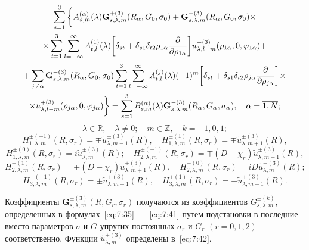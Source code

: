 \begin{multline}
\sum\limits_{s = 1}^3 \bigg\{  A_{s,m}^{(\alpha )}(\lambda ){\bf{G}}_{s,\lambda ,m}^{ + (3)}({R_\alpha },{G_0},{\sigma _0}) + {\bf{G}}_{s,\lambda ,m}^{ - (3)}({R_\alpha },{G_0},{\sigma _0}) \times \\
\times \sum\limits_{t = 1}^3 {\sum\limits_{l =  - \infty }^\infty  {A_{t,l}^{(1)}} } (\lambda )\bigg[{\delta _{st}} + {\delta _{s1}}{\delta _{t2}}{\rho _{1\alpha }}\frac{\partial }{{\partial {\rho _{1\alpha }}}}\bigg]u_{\lambda ,l - m}^{ - (3)}({\rho _{1\alpha }},0,{\varphi _{1\alpha }}) + \\
+ \sum\limits_{j \ne \alpha } {{\bf{G}}_{s,\lambda ,m}^{ - (3)}} ({R_\alpha },{G_0},{\sigma _0})\sum\limits_{t = 1}^3 {\sum\limits_{l =  - \infty }^\infty  {A_{t,l}^{(j)}} } (\lambda ){( - 1)^m}\bigg[{\delta _{st}} + {\delta _{s1}}{\delta _{t2}}{\rho _{j\alpha }}\frac{\partial }{{\partial {\rho _{j\alpha }}}}\bigg] \times \\
\times u_{\lambda ,l - m}^{ + (3)}({\rho _{j\alpha }},0,{\varphi _{j\alpha }})\bigg\}  = \sum\limits_{s = 1}^3 {B_{s,m}^{(\alpha )}} (\lambda ){\bf{G}}_{s,\lambda ,m}^{ - (3)}({R_\alpha },{G_\alpha },{\sigma _\alpha }),\;\;\;{\mkern 1mu} {\kern 1pt} \alpha  = \overline {1,N}; 
\end{multline}
$$
\lambda\in\mathbb{R},\quad\lambda\neq 0;\quad m\in\mathbb{Z},\quad k=-1,0,1;
$$
$$
H_{1,\lambda ,m}^{ \pm ( - 1)}(R,{\sigma _r}) =  \mp \tilde u_{\lambda ,m - 1}^{ \pm (3)}(R),\quad H_{1,\lambda ,m}^{ \pm (1)}(R,{\sigma _r}) =  \mp \tilde u_{\lambda ,m + 1}^{ \pm (3)}(R),
$$
$$
H_{1,\lambda ,m}^{ \pm (0)}(R,{\sigma _r}) = i\tilde u_{\lambda ,m}^{ \pm (3)}(R);\quad H_{2,\lambda ,m}^{ \pm ( - 1)}(R,{\sigma _r}) =  \mp \left( {D - {\chi _r}} \right)\tilde u_{\lambda ,m - 1}^{ \pm (3)}(R),
$$
$$
H_{2,\lambda ,m}^{ \pm (1)}(R,{\sigma _r}) =  \mp \left( {D - {\chi _r}} \right)\tilde u_{\lambda ,m + 1}^{ \pm (3)}(R),\quad H_{2,\lambda ,m}^{ \pm (0)}(R,{\sigma _r}) = iD\tilde u_{\lambda ,m}^{ \pm (3)}(R);
$$
$$
H_{3,\lambda ,m}^{ \pm ( - 1)}(R,{\sigma _r}) =  \pm \tilde u_{\lambda ,m - 1}^{ \pm (3)}(R),\quad H_{3,\lambda ,m}^{ \pm (1)}(R,{\sigma _r}) =  \mp \tilde u_{\lambda ,m + 1}^{ \pm (3)}(R).
$$

Коэффициенты $\mathbf{G}_{s,\lambda,m}^{\pm(3)}(R,G_r,\sigma_r)$ получаются из коэффициентов $G_{s,\lambda,m}^{\pm(k)}$, определенных в формулах~\eqref{eq:7:35}~--- \eqref{eq:7:41} путем подстановки в последние вместо параметров $\sigma$ и $G$ упругих постоянных $\sigma_r$ и $G_r$ $(r=0,1,2)$ соответственно. Функции $\tilde u_{\lambda,m}^{\pm(3)}$ определены в~\eqref{eq:7:42}.

